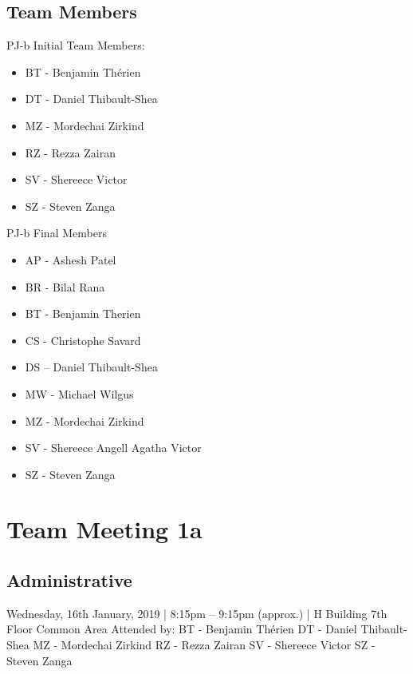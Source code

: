 \documentclass[12pt]{article}
\begin{document}
\subsection{Team Members}

PJ-b Initial Team Members:
\begin{itemize}
	\item BT - Benjamin Thérien 
	\item DT - Daniel Thibault-Shea
	\item MZ - Mordechai Zirkind 
	\item RZ - Rezza Zairan
	\item SV - Shereece Victor
	\item SZ - Steven Zanga 
\end{itemize}


PJ-b Final Members
\begin{itemize}
	\item AP - Ashesh Patel 
	\item BR - Bilal Rana
	\item BT - Benjamin Therien
	\item CS - Christophe Savard
	\item DS – Daniel Thibault-Shea
	\item MW - Michael Wilgus
	\item MZ - Mordechai Zirkind
	\item SV - Shereece Angell Agatha Victor
	\item SZ - Steven Zanga
\end{itemize}
 

\pagebreak
\section{Team Meeting 1a }

\subsection{Administrative}
Wednesday, 16th January, 2019 | 8:15pm – 9:15pm (approx.) | H Building 7th Floor Common Area 
Attended by: 
BT - Benjamin Thérien 
DT - Daniel Thibault-Shea 
MZ - Mordechai Zirkind 
RZ - Rezza Zairan 
SV - Shereece Victor 
SZ - Steven Zanga
\end{document}
